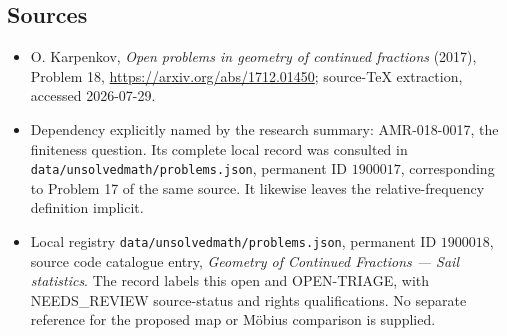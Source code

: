 \documentclass[11pt]{article}
\begin{document}
\subsection{Sources}
\begin{itemize}
\item O. Karpenkov, \emph{Open problems in geometry of continued fractions} (2017), Problem 18, \url{https://arxiv.org/abs/1712.01450}; source-TeX extraction, accessed 2026-07-29.
\item Dependency explicitly named by the research summary: AMR-018-0017, the finiteness question. Its complete local record was consulted in \texttt{data/unsolvedmath/problems.json}, permanent ID $1900017$, corresponding to Problem 17 of the same source. It likewise leaves the relative-frequency definition implicit.
\item Local registry \texttt{data/unsolvedmath/problems.json}, permanent ID $1900018$, source code catalogue entry, \emph{Geometry of Continued Fractions --- Sail statistics}. The record labels this open and OPEN-TRIAGE, with NEEDS\_REVIEW source-status and rights qualifications. No separate reference for the proposed map or M\"obius comparison is supplied.
\end{itemize}
\end{document}
